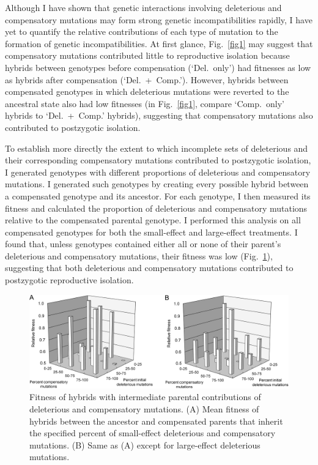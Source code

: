 \begin{doublespace}
Although I have shown that genetic interactions
involving deleterious and compensatory mutations
may form strong genetic incompatibilities rapidly,
I have yet to quantify the relative contributions
of each type of mutation to the formation of genetic incompatibilities.
%
At first glance, Fig.~\ref{fig1}
may suggest that compensatory mutations
contributed little to reproductive isolation
because hybrids between genotypes before compensation (`Del.~only')
had fitnesses as low as hybrids after compensation (`Del.~+~Comp.').
%
However, hybrids between compensated genotypes in which deleterious mutations
were reverted to the ancestral state also had low fitnesses
(in Fig.~\ref{fig1}, compare `Comp.~only' hybrids to `Del.~+~Comp.' hybrids),
suggesting that compensatory mutations
also contributed to postzygotic isolation.



To establish more directly the extent to which incomplete sets
of deleterious and their corresponding compensatory mutations
contributed to postzygotic isolation,
I generated genotypes with different proportions
of deleterious and compensatory mutations.
%
I generated such genotypes by creating every possible hybrid
between a compensated genotype and its ancestor.
%
For each genotype, I then measured its fitness and calculated
the proportion of deleterious and compensatory mutations
relative to the compensated parental genotype.
%
I performed this analysis on all compensated genotypes
for both the small-effect and large-effect treatments.
%
I found that, unless genotypes contained either
all or none of their parent's deleterious and compensatory mutations,
their fitness was low (Fig.~\ref{fig3}),
suggesting that both deleterious and compensatory mutations
contributed to postzygotic reproductive isolation.



\begin{figure}
\centering
\includegraphics[width=\linewidth]{fig3.png}
\caption{Fitness of hybrids with intermediate parental contributions
  of deleterious and compensatory mutations.
  (A) Mean fitness of hybrids between the ancestor
  and compensated parents that inherit the specified percent of small-effect
  deleterious and compensatory mutations. (B) Same as (A) except for
  large-effect deleterious mutations.}
\label{fig3}
\end{figure}




\end{doublespace}
